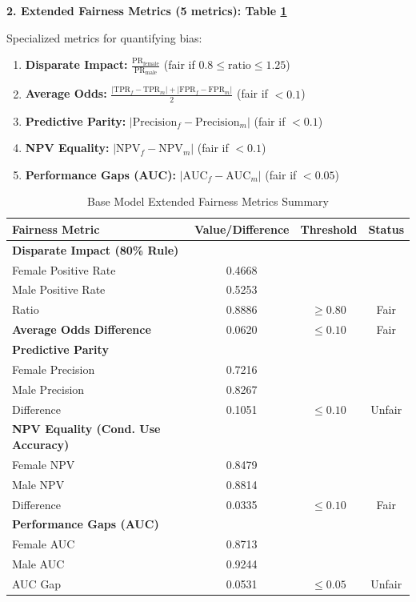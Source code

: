 \documentclass[11pt,a4paper]{article}
\begin{document}
\textbf{2. Extended Fairness Metrics (5 metrics): Table \ref{tab:fairness_metrics_baseline}}

Specialized metrics for quantifying bias:

\begin{enumerate}
    \item \textbf{Disparate Impact:} $\frac{\text{PR}_{\text{female}}}{\text{PR}_{\text{male}}}$ (fair if $0.8 \leq \text{ratio} \leq 1.25$)

    \item \textbf{Average Odds:} $\frac{|\text{TPR}_f - \text{TPR}_m| + |\text{FPR}_f - \text{FPR}_m|}{2}$ (fair if $< 0.1$)

    \item \textbf{Predictive Parity:} $|\text{Precision}_f - \text{Precision}_m|$ (fair if $< 0.1$)

    \item \textbf{NPV Equality:} $|\text{NPV}_f - \text{NPV}_m|$ (fair if $< 0.1$)

    \item \textbf{Performance Gaps (AUC):} $|\text{AUC}_f - \text{AUC}_m|$ (fair if $< 0.05$)
\end{enumerate}

\begin{table}[h]
\centering
\caption{Base Model Extended Fairness Metrics Summary}
\label{tab:fairness_metrics_baseline}
\begin{tabular}{|l|c|c|c|}
\hline
\textbf{Fairness Metric} & \textbf{Value/Difference} & \textbf{Threshold} & \textbf{Status} \\
\hline
\textbf{Disparate Impact (80\% Rule)} &  &  &  \\
\quad Female Positive Rate & 0.4668 &  &  \\
\quad Male Positive Rate & 0.5253 &  &  \\
\quad Ratio & 0.8886 & $\geq 0.80$ & Fair  \\
\hline
\textbf{Average Odds Difference} & 0.0620 & $\leq 0.10$ & Fair  \\
\hline
\textbf{Predictive Parity} &  &  &  \\
\quad Female Precision & 0.7216 &  &  \\
\quad Male Precision & 0.8267 &  &  \\
\quad Difference & 0.1051 & $\leq 0.10$ & Unfair \\
\hline
\textbf{NPV Equality (Cond. Use Accuracy)} &  &  &  \\
\quad Female NPV & 0.8479 &  &  \\
\quad Male NPV & 0.8814 &  &  \\
\quad Difference & 0.0335 & $\leq 0.10$ & Fair \\
\hline
\textbf{Performance Gaps (AUC)} &  &  &  \\
\quad Female AUC & 0.8713 &  &  \\
\quad Male AUC & 0.9244 &  &  \\
\quad AUC Gap & 0.0531 & $\leq 0.05$ & Unfair  \\
\hline
\end{tabular}
\end{table}
\end{document}
